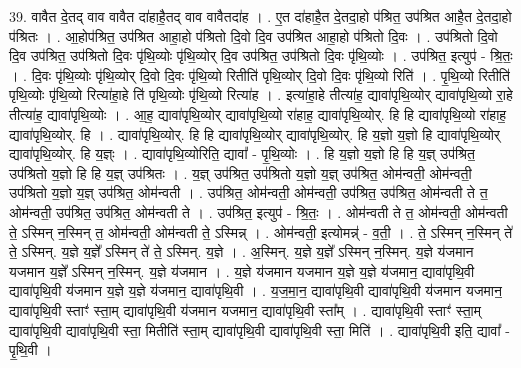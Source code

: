 \documentclass[17pt]{extarticle}
\begin{document}
39. वावैत दे॒तद् वाव वावैत दा॑हाहै॒तद् वाव वावैतदा॑ह । . ए॒त दा॑हाहै॒त दे॒तदा॒हो प॑श्रित॒ उप॑श्रित आहै॒त दे॒तदा॒हो प॑श्रितः । . आ॒होप॑श्रित॒ उप॑श्रित आहा॒हो प॑श्रितो दि॒वो दि॒व उप॑श्रित आहा॒हो प॑श्रितो दि॒वः । . उप॑श्रितो दि॒वो दि॒व उप॑श्रित॒ उप॑श्रितो दि॒वः पृ॑थि॒व्योः पृ॑थि॒व्योर् दि॒व उप॑श्रित॒ उप॑श्रितो दि॒वः पृ॑थि॒व्योः । . उप॑श्रित॒ इत्युप॑ - श्रि॒तः॒ । . दि॒वः पृ॑थि॒व्योः पृ॑थि॒व्योर् दि॒वो दि॒वः पृ॑थि॒व्यो रितीति॑ पृथि॒व्योर् दि॒वो दि॒वः पृ॑थि॒व्यो रिति॑ । . पृ॒थि॒व्यो रितीति॑ पृथि॒व्योः पृ॑थि॒व्यो रित्या॑हा॒हे ति॑ पृथि॒व्योः पृ॑थि॒व्यो रित्या॑ह । . इत्या॑हा॒हे तीत्या॑ह॒ द्यावा॑पृथि॒व्योर् द्यावा॑पृथि॒व्यो रा॒हे तीत्या॑ह॒ द्यावा॑पृथि॒व्योः । . आ॒ह॒ द्यावा॑पृथि॒व्योर् द्यावा॑पृथि॒व्यो रा॑हाह॒ द्यावा॑पृथि॒व्योर्. हि हि द्यावा॑पृथि॒व्यो रा॑हाह॒ द्यावा॑पृथि॒व्योर्. हि । . द्यावा॑पृथि॒व्योर्. हि हि द्यावा॑पृथि॒व्योर् द्यावा॑पृथि॒व्योर्. हि य॒ज्ञो य॒ज्ञो हि द्यावा॑पृथि॒व्योर् द्यावा॑पृथि॒व्योर्. हि य॒ज्ञ्ः । . द्यावा॑पृथि॒व्योरिति॒ द्यावा᳚ - पृ॒थि॒व्योः । . हि य॒ज्ञो य॒ज्ञो हि हि य॒ज्ञ् उप॑श्रित॒ उप॑श्रितो य॒ज्ञो हि हि य॒ज्ञ् उप॑श्रितः । . य॒ज्ञ् उप॑श्रित॒ उप॑श्रितो य॒ज्ञो य॒ज्ञ् उप॑श्रित॒ ओम॑न्वती॒ ओम॑न्वती॒ उप॑श्रितो य॒ज्ञो य॒ज्ञ् उप॑श्रित॒ ओम॑न्वती । . उप॑श्रित॒ ओम॑न्वती॒ ओम॑न्वती॒ उप॑श्रित॒ उप॑श्रित॒ ओम॑न्वती ते त॒ ओम॑न्वती॒ उप॑श्रित॒ उप॑श्रित॒ ओम॑न्वती ते । . उप॑श्रित॒ इत्युप॑ - श्रि॒तः॒ । . ओम॑न्वती ते त॒ ओम॑न्वती॒ ओम॑न्वती ते॒ ऽस्मिन् न॒स्मिन् त॒ ओम॑न्वती॒ ओम॑न्वती ते॒ ऽस्मिन्न् । . ओम॑न्वती॒ इत्योमन्न्॑ - व॒ती॒ । . ते॒ ऽस्मिन् न॒स्मिन् ते॑ ते॒ ऽस्मिन्. य॒ज्ञे य॒ज्ञे᳚ ऽस्मिन् ते॑ ते॒ ऽस्मिन्. य॒ज्ञे । . अ॒स्मिन्. य॒ज्ञे य॒ज्ञे᳚ ऽस्मिन् न॒स्मिन्. य॒ज्ञे य॑जमान यजमान य॒ज्ञे᳚ ऽस्मिन् न॒स्मिन्. य॒ज्ञे य॑जमान । . य॒ज्ञे य॑जमान यजमान य॒ज्ञे य॒ज्ञे य॑जमान॒ द्यावा॑पृथि॒वी द्यावा॑पृथि॒वी य॑जमान य॒ज्ञे य॒ज्ञे य॑जमान॒ द्यावा॑पृथि॒वी । . य॒ज॒मा॒न॒ द्यावा॑पृथि॒वी द्यावा॑पृथि॒वी य॑जमान यजमान॒ द्यावा॑पृथि॒वी स्ताꣳ॑ स्ता॒म् द्यावा॑पृथि॒वी य॑जमान यजमान॒ द्यावा॑पृथि॒वी स्ता᳚म् । . द्यावा॑पृथि॒वी स्ताꣳ॑ स्ता॒म् द्यावा॑पृथि॒वी द्यावा॑पृथि॒वी स्ता॒ मितीति॑ स्ता॒म् द्यावा॑पृथि॒वी द्यावा॑पृथि॒वी स्ता॒ मिति॑ । . द्यावा॑पृथि॒वी इति॒ द्यावा᳚ - पृ॒थि॒वी । \newline
\pagebreak
{}
\end{document}
